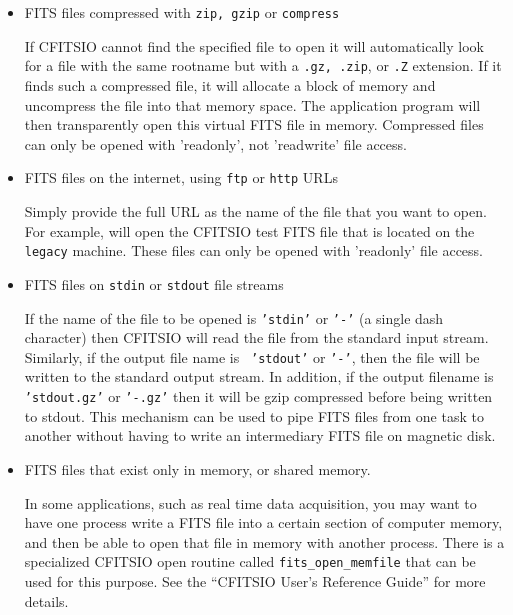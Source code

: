 \documentclass[11pt]{article}
\begin{document}
\begin{itemize}
\item FITS files compressed with {\tt zip, gzip} or {\tt compress}

If CFITSIO cannot find the specified file to open it will automatically
look for a file with the same rootname but with a {\tt .gz, .zip}, or
{\tt .Z} extension.  If it finds such a compressed file, it will
allocate a block of memory and uncompress the file into that memory
space.  The application program will then transparently open this
virtual FITS file in memory.  Compressed
files can only be opened with 'readonly', not 'readwrite' file access.

\item  FITS files on the internet, using {\tt ftp} or {\tt http} URLs

Simply provide the full URL as the name of the file that you want to
open.  For example,\linebreak
will open the CFITSIO test FITS file that is located on the {\tt
legacy} machine.  These files can only be opened with 'readonly' file
access.

\item  FITS files on {\tt stdin} or {\tt stdout} file streams

If the name of the file to be opened is {\tt 'stdin'} or {\tt '-'} (a
single dash character) then CFITSIO will read the file from the
standard input stream.  Similarly, if the output file name is {\tt
'stdout'} or {\tt '-'}, then the file will be written to the standard
output stream.  In addition, if the output filename is {\tt
'stdout.gz'} or {\tt '-.gz'} then it will be gzip compressed before
being written to stdout.  This mechanism can be used to pipe FITS files
from one task to another without having to write an intermediary FITS
file on magnetic disk.

\item FITS files that exist only in memory, or shared memory.

In some applications, such as real time data acquisition, you may want
to have one process write a FITS file into a certain section of
computer memory, and then be able to open that file in memory with
another process.  There is a specialized CFITSIO open routine called
{\tt fits\_open\_memfile} that can be used for this purpose.  See the
``CFITSIO User's Reference Guide'' for more details.


\end{itemize}
\end{document}
